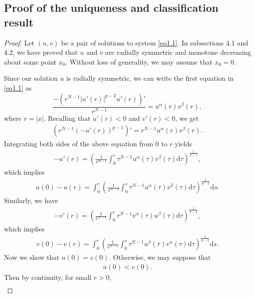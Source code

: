 \documentclass[12pt]{amsart}
\theoremstyle{definition}
\theoremstyle{remark}
\theoremstyle{conclusion}
\theoremstyle{conjecture}
\numberwithin{equation}{section}
\begin{document}
\subsection{Proof of the uniqueness and classification result}\label{sc5}

\begin{proof}

  Let $(u, v)$ be a pair of solutions to system \eqref{eq1.1}. In subsections 4.1 and 4.2, we have proved that $u$ and $v$ are radially symmetric and monotone decreasing about some point $x_0$. Without loss of generality, we may assume that $x_0=0$.

    Since our solution $u$ is radially symmetric, we can write the first equation in \eqref{eq1.1} as
    $$\frac{-(r^{N-1}|u'(r)|^{p-2}u'(r))'}{r^{N-1}}=u^\alpha(r)v^\beta(r),$$
    where $r=|x|$.
    Recalling that $u'(r)<0$ and $v'(r)<0$, we get
    \begin{align}\label{Key}
        (r^{N-1}(-u'(r))^{p-1})'=r^{N-1}u^\alpha(r)v^\beta(r).
    \end{align}
    Integrating both sides of the above equation from $0$ to $r$ yields
    \begin{align}\label{eq5.10}
      -u'(r)=\left(\frac{1}{r^{N-1}} \int_0^r \tau^{N-1}u^\alpha(\tau) v^\beta(\tau) \mathrm{d}\tau\right)^{\frac{1}{p-1}},
        \end{align}
    which implies
    \begin{align}\label{eq5.1}
        u(0)-u(r)=\int_0^r \left(\frac{1}{s^{N-1}} \int_0^s \tau^{N-1}u^\alpha(\tau) v^\beta(\tau) \mathrm{d}\tau\right)^{\frac{1}{p-1}}\mathrm{d}s.
        \end{align}
    Similarly, we have
     \begin{align}\label{eq5.10'}
      -v'(r)=\left(\frac{1}{r^{N-1}} \int_0^r \tau^{N-1}v^\alpha(\tau) u^\beta(\tau) \mathrm{d}\tau\right)^{\frac{1}{p-1}},
        \end{align}
      which implies
    \begin{align}\label{eq5.1-}
        v(0)-v(r)=\int_0^r \left(\frac{1}{s^{N-1}} \int_0^s \tau^{N-1}u^\beta(\tau) v^\alpha(\tau) \mathrm{d}\tau\right)^{\frac{1}{p-1}}\mathrm{d}s.
    \end{align}
    Now we show that $u(0)=v(0)$. Otherwise, we may  suppose that
    \begin{align}\label{ineq5.1}
        u(0)<v(0).
    \end{align}
    Then by continuity, for small $r>0$,
    \begin{align}\label{ineq5.2}

\end{align}
\end{proof}
\end{document}
